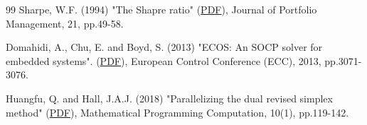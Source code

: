 \begin{thebibliography}{99}
 Sharpe, W.F. (1994) "The Shapre ratio"
(\href{https://www.earnforex.com/books/en/advanced-forex-trading/The_Sharpe_Ratio.pdf}{PDF}),
Journal of Portfolio Management, 21, pp.49-58.

 Domahidi, A., Chu, E. and Boyd, S. (2013) "ECOS: An SOCP solver for embedded systems".
(\href{https://web.stanford.edu/~boyd/papers/pdf/ecos_ecc.pdf}{PDF}),
European Control Conference (ECC), 2013, pp.3071-3076.

 Huangfu, Q.  and Hall, J.A.J. (2018) "Parallelizing the dual revised simplex method"
(\href{https://www.maths.ed.ac.uk/~jajhall/HuHa13/HuHa13.pdf}{PDF}),
Mathematical Programming Computation, 10(1), pp.119-142.






%
%
%
%
%
%
%
%








\end{thebibliography} 